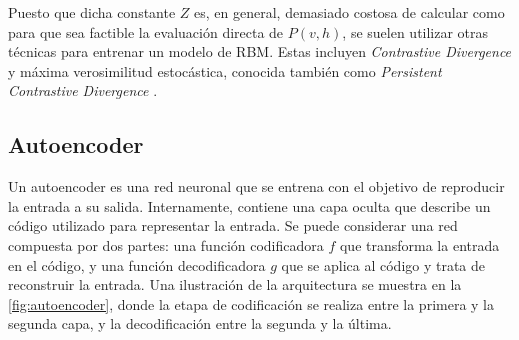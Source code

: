 Puesto que dicha constante $Z$ es, en general, demasiado costosa de calcular como para que sea factible la evaluación directa de $P(v, h)$, se suelen utilizar otras técnicas para entrenar un modelo de RBM. Estas incluyen \textit{Contrastive Divergence} \autocite{hinton2002cd} y máxima verosimilitud estocástica, conocida también como \textit{Persistent Contrastive Divergence} \autocite{tieleman2008pcd}.

\subsection{Autoencoder}\label{sec:autoencoder}

Un autoencoder es una red neuronal que se entrena con el objetivo de reproducir la entrada a su salida. Internamente, contiene una capa oculta que describe un código utilizado para representar la entrada. Se puede considerar una red compuesta por dos partes: una función codificadora $f$ que transforma la entrada en el código, y una función decodificadora $g$ que se aplica al código y trata de reconstruir la entrada. Una ilustración de la arquitectura se muestra en la \autoref{fig:autoencoder}, donde la etapa de codificación se realiza entre la primera y la segunda capa, y la decodificación entre la segunda y la última.

